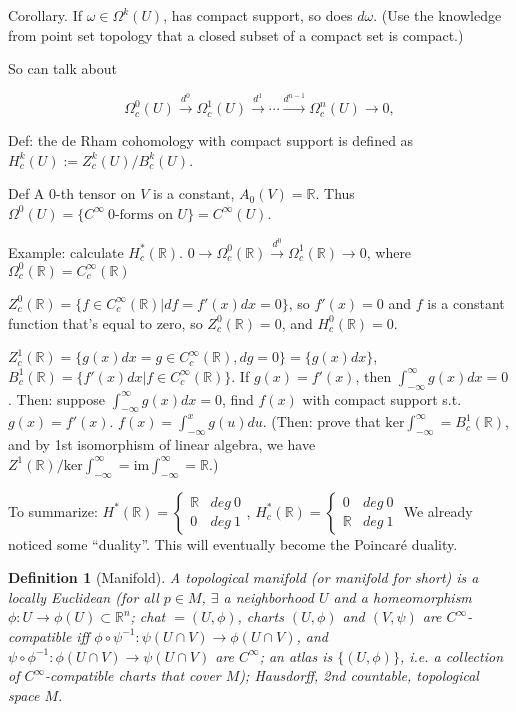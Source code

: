 \documentclass{article}
\theoremstyle{mystyle}
\newtheorem*{definition}{Definition}%
\theoremstyle{remark}
\numberwithin{equation}{section}
\begin{document}
Corollary. If $\omega\in \Omega^k(U)$, has compact support, so does $d\omega$. (Use the knowledge from point set topology that a closed subset of a compact set is compact.)

So can talk about 

$$\Omega^0_c(U)\xrightarrow{d^0}\Omega^1_c(U)\xrightarrow{d^1}\cdots \xrightarrow{d^{n-1}} \Omega^n_c(U)\rightarrow 0,$$

Def: the de Rham cohomology with compact support is defined as $H^k_c(U) := Z^k_c(U)/B^k_c(U)$. 

Def A $0$-th tensor on $V$ is a constant, $A_0(V) = \mathbb{R}$. Thus $\Omega^0(U) = \{C^\infty~0\text{-forms on }U\} = C^\infty(U)$.

Example: calculate $H^*_c(\mathbb{R})$. $0\rightarrow \Omega^0_c(\mathbb{R})\xrightarrow {d^0}\Omega^1_c(\mathbb{R})\rightarrow 0$, where $\Omega^0_c(\mathbb{R}) = C^\infty_c(\mathbb{R})$

$Z^0_c(\mathbb{R}) = \{f \in C^\infty_c(\mathbb{R})|df=f'(x)dx = 0\}$, so $f'(x)=0$ and $f$ is a constant function that's equal to zero, so $Z^0_c(\mathbb{R}) = 0$, and $H^0_c(\mathbb{R}) = 0$. 

$Z^1_c(\mathbb{R}) = \{g(x)dx = g\in C^\infty_c(\mathbb{R}),dg=0\} = \{g(x)dx\}$, $B^1_c(\mathbb{R}) = \{f'(x)dx |f \in C^\infty_c (\mathbb{R})\}$. If $g(x)=f'(x)$, then $\int^\infty_{-\infty} g(x)dx=0$. Then: suppose $\int^\infty_{-\infty} g(x)dx=0$, find $f(x)$ with compact support s.t. $g(x)=f'(x)$. $f(x)=\int^x_{-\infty}g(u)du$. 
(Then: prove that $\mathrm{ker}\int^\infty_{-\infty} = B^1_c(\mathbb{R})$, and by 1st isomorphism of linear algebra, we have $Z^1(\mathbb{R})/\mathrm{ker}\int^\infty_{-\infty} = \mathrm{im}\int^\infty_{-\infty} = \mathbb{R}$.)

To summarize: $H^*(\mathbb{R}) = \left\{\begin{array}{ll} \mathbb{R} & deg ~0\\0 & deg ~1\end{array}\right.$, $H^*_c(\mathbb{R}) = \left\{\begin{array}{ll} 0 & deg ~0\\\mathbb{R} & deg ~1\end{array}\right.$
We already noticed some ``duality''. This will eventually become the Poincar\'e duality.




\begin{definition}[Manifold] A \emph{topological manifold (or manifold for short)} is a locally Euclidean (for all $p\in M$, $\exists$ a neighborhood $U$ and a homeomorphism $\phi\colon U\rightarrow \phi(U) \subset \mathbb{R}^n$; chat $=(U,\phi)$, charts $(U,\phi)$ and $(V,\psi)$ are $C^\infty$-compatible iff $\phi\circ \psi^{-1}\colon \psi(U\cap V) \rightarrow \phi(U\cap V)$, and $\psi\circ \phi^{-1}\colon \phi(U\cap V)\rightarrow \psi(U\cap V)$ are $C^\infty$; an atlas is $\{(U,\phi)\}$, i.e. a collection of $C^\infty$-compatible charts that cover $M$); Hausdorff, 2nd countable, topological space $M$.
\end{definition}
\end{document}
